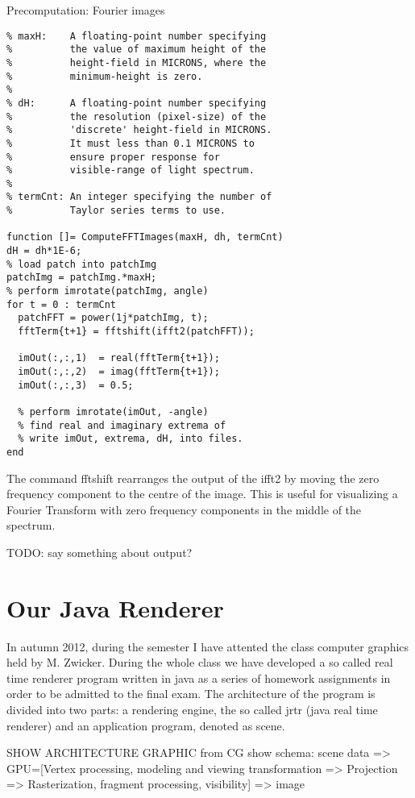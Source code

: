 \begin{algorithm}
\caption{Precomputation: Fourier images}
\begin{lstlisting}
% maxH:    A floating-point number specifying 
%          the value of maximum height of the 
%          height-field in MICRONS, where the 
%          minimum-height is zero. 
%         
% dH:      A floating-point number specifying 
%          the resolution (pixel-size) of the 
%          'discrete' height-field in MICRONS. 
%          It must less than 0.1 MICRONS to 
%          ensure proper response for 
%          visible-range of light spectrum.
%
% termCnt: An integer specifying the number of 
%          Taylor series terms to use.

function []= ComputeFFTImages(maxH, dh, termCnt)
dH = dh*1E-6;
% load patch into patchImg
patchImg = patchImg.*maxH;
% perform imrotate(patchImg, angle)
for t = 0 : termCnt
  patchFFT = power(1j*patchImg, t);
  fftTerm{t+1} = fftshift(ifft2(patchFFT));
  
  imOut(:,:,1)  = real(fftTerm{t+1});
  imOut(:,:,2)  = imag(fftTerm{t+1});
  imOut(:,:,3)  = 0.5;
  
  % perform imrotate(imOut, -angle)
  % find real and imaginary extrema of 
  % write imOut, extrema, dH, into files.
end
\end{lstlisting}
\end{algorithm}

The command fftshift rearranges the output of the ifft2 by moving the zero frequency component to the centre of the image. This is useful for visualizing a Fourier Transform with zero frequency components in the middle of the spectrum.

TODO: say something about output?

\section{Our Java Renderer}
In autumn 2012, during the semester I have attented the class computer graphics held by M. Zwicker. During the whole class we have developed a so called real time renderer program written in java as a series of homework assignments in order to be admitted to the final exam. The architecture of the program is divided into two parts: a rendering engine, the so called jrtr (java real time renderer) and an application program, denoted as scene.

SHOW ARCHITECTURE GRAPHIC from CG
show schema: scene data => GPU=[Vertex processing, modeling and viewing transformation => Projection => Rasterization, fragment processing, visibility] => image

